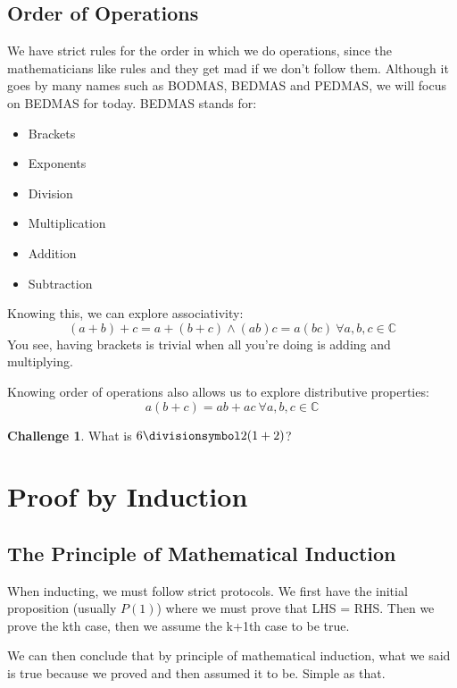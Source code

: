 \documentclass[a4paper]{article}
\theoremstyle{plain}
\theoremstyle{definition}
\newtheorem{challenge}{Challenge}[section]
\theoremstyle{remark}
\newcommand{\sectionSpace}{\vspace{2em}} %
\begin{document}
        \subsection{Order of Operations}
        We have strict rules for the order in which we do operations, since the mathematicians like rules and they get mad if we don't follow them. Although it goes by many names such as BODMAS, BEDMAS and PEDMAS, we will focus on BEDMAS for today. BEDMAS stands for:
        \begin{itemize}
            \item Brackets
            \item Exponents
            \item Division
            \item Multiplication
            \item Addition
            \item Subtraction
        \end{itemize}
        
        Knowing this, we can explore associativity:
        $$(a+b) + c = a + (b+c) \wedge (ab)c = a(bc) \ \forall a, b, c \in \mathbb{C}$$
        You see, having brackets is trivial when all you're doing is adding and multiplying.

        Knowing order of operations also allows us to explore distributive properties:
        $$a(b+c) = ab + ac \ \forall a, b, c \in \mathbb{C}$$

        \begin{challenge}
            What is $6 \divisionsymbol 2(1+2)$?
        \end{challenge}

        


\sectionSpace
\section{Proof by Induction}
    \subsection{The Principle of Mathematical Induction}
    When inducting, we must follow strict protocols. We first have the initial proposition (usually $P(1)$) where we must prove that LHS = RHS. Then we prove the kth case, then we assume the k+1th case to be true. 

    We can then conclude that by principle of mathematical induction, what we said is true because we proved and then assumed it to be. Simple as that.
\end{document}
